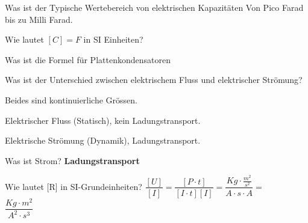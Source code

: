 \begin{lk}{Was ist der Typische Wertebereich von elektrischen Kapazitäten}
	Von Pico Farad bis zu Milli Farad.
\end{lk}	

\begin{lk}{Wie lautet $[C] = F$ in SI Einheiten?} 
\end{lk}	

\begin{lk}{Was ist die Formel für Plattenkondensatoren}
	\\[12pt]
\end{lk}	



\begin{lk}{Was ist der Unterschied zwischen elektrischem Fluss und elektrischer Strömung?}
	\begin{compactitem}
		\item Beides sind kontinuierliche Grössen.
		\item Elektrischer Fluss (Statisch), kein Ladungstransport.
		\item Elektrische Strömung (Dynamik), Ladungstransport.
	\end{compactitem}
\end{lk}

\begin{lk}{Was ist Strom?}
	\textbf{Ladungstransport}
\end{lk}

\begin{lk}{Wie lautet [R] in SI-Grundeinheiten?}
	$ \dfrac{[U]}{[I]} = \dfrac{[P \cdot t]}{[I \cdot t][I]} = \dfrac{Kg \cdot \frac{m^2}{s^2}}{A \cdot s \cdot A} = $\\[12pt]
	\LARGE{ $ \dfrac{Kg \cdot m^2}{A^2 \cdot s^3} $ }
\end{lk}

